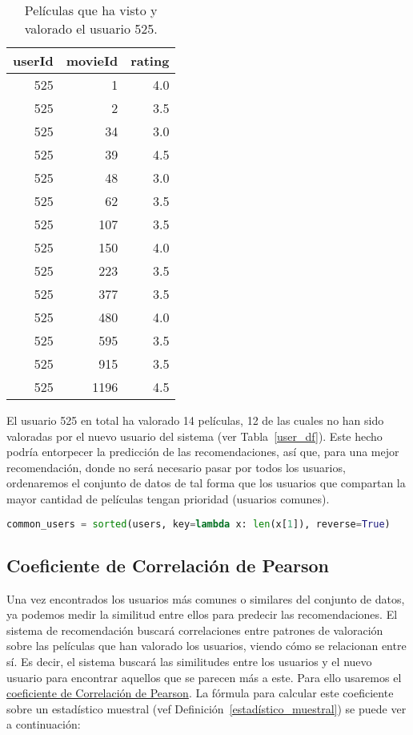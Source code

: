 \documentclass{uimppracticas}
\begin{document}
\begin{table}[H]
	\centering
	\begin{tabular}{rrr}
		\toprule
		userId &  movieId &  rating \\
		\midrule
		525 &        1 &     4.0 \\
		525 &        2 &     3.5 \\
		525 &       34 &     3.0 \\
		525 &       39 &     4.5 \\
		525 &       48 &     3.0 \\
		525 &       62 &     3.5 \\
		525 &      107 &     3.5 \\
		525 &      150 &     4.0 \\
		525 &      223 &     3.5 \\
		525 &      377 &     3.5 \\
		525 &      480 &     4.0 \\
		525 &      595 &     3.5 \\
		525 &      915 &     3.5 \\
		525 &     1196 &     4.5 \\
		\bottomrule
	\end{tabular}
	\caption{Películas que ha visto y valorado el usuario 525.}
	\label{user_525}
\end{table}

El usuario 525 en total ha valorado 14 películas, 12 de las cuales no han sido valoradas por el nuevo usuario del sistema (ver Tabla~\ref{user_df}). Este hecho podría entorpecer la predicción de las recomendaciones, así que, para una mejor recomendación, donde no será necesario pasar por todos los usuarios, ordenaremos el conjunto de datos de tal forma que los usuarios que compartan la mayor cantidad de películas tengan prioridad (usuarios comunes).

\begin{lstlisting}[language=python, basicstyle=\small]
common_users = sorted(users, key=lambda x: len(x[1]), reverse=True)
\end{lstlisting}

\subsection{Coeficiente de Correlación de Pearson}\label{correlacion_pearson}

Una vez encontrados los usuarios más comunes o similares del conjunto de datos, ya podemos medir la similitud entre ellos para predecir las recomendaciones. El sistema de recomendación buscará correlaciones entre patrones de valoración sobre las películas que han valorado los usuarios, viendo cómo se relacionan entre sí. Es decir, el sistema buscará las similitudes entre los usuarios y el nuevo usuario para encontrar aquellos que se parecen más a este. Para ello usaremos el \href{https://es.wikipedia.org/wiki/Coeficiente_de_correlaci\%C3\%B3n_de_Pearson}{coeficiente de Correlación de Pearson}. La fórmula para calcular este coeficiente sobre un estadístico muestral (vef Definición~\ref{estadístico_muestral}) se puede ver a continuación:
\end{document}
